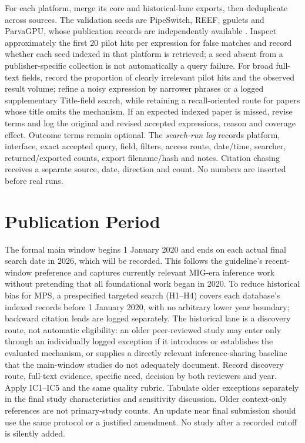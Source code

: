 \documentclass[12pt,a4paper]{article}
\begin{document}
For each platform, merge its core and historical-lane exports, then deduplicate across sources. The validation seeds are PipeSwitch, REEF, gpulets and ParvaGPU, whose publication records are independently available \cite{pipeswitch,reef,gpulets,parvagpu}. Inspect approximately the first 20 pilot hits per expression for false matches and record whether each seed indexed in that platform is retrieved; a seed absent from a publisher-specific collection is not automatically a query failure. For broad full-text fields, record the proportion of clearly irrelevant pilot hits and the observed result volume; refine a noisy expression by narrower phrases or a logged supplementary Title-field search, while retaining a recall-oriented route for papers whose title omits the mechanism. If an expected indexed paper is missed, revise terms and log the original and revised accepted expressions, reason and coverage effect. Outcome terms remain optional. The \emph{search-run log} records platform, interface, exact accepted query, field, filters, access route, date/time, searcher, returned/exported counts, export filename/hash and notes. Citation chasing receives a separate source, date, direction and count. No numbers are inserted before real runs.

\section{Publication Period}
The formal main window begins 1 January 2020 and ends on each actual final search date in 2026, which will be recorded. This follows the guideline's recent-window preference and captures currently relevant MIG-era inference work without pretending that all foundational work began in 2020. To reduce historical bias for MPS, a prespecified targeted search (H1--H4) covers each database's indexed records before 1 January 2020, with no arbitrary lower year boundary; backward citation leads are logged separately. The historical lane is a discovery route, not automatic eligibility: an older peer-reviewed study may enter only through an individually logged exception if it introduces or establishes the evaluated mechanism, or supplies a directly relevant inference-sharing baseline that the main-window studies do not adequately document. Record discovery route, full-text evidence, specific need, decision by both reviewers and year. Apply IC1--IC5 and the same quality rubric. Tabulate older exceptions separately in the final study characteristics and sensitivity discussion. Older context-only references are not primary-study counts. An update near final submission should use the same protocol or a justified amendment. No study after a recorded cutoff is silently added.
\end{document}
